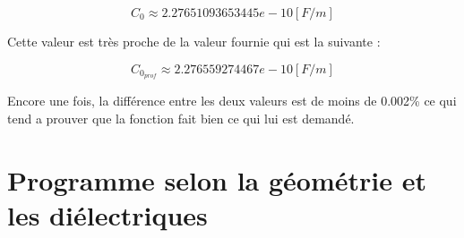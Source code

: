 \begin{equation}
	C_0 \approx 2.27651093653445e-10 [F/m]
\end{equation}

Cette valeur est très proche de la valeur fournie qui est la suivante :

\begin{equation}
	C_{0_{prof}} \approx 2.276559274467e-10 [F/m]
\end{equation}

Encore une fois, la différence entre les deux valeurs est de moins de 0.002\% ce qui tend a prouver que la fonction fait bien ce qui lui est demandé.

\section{Programme selon la géométrie et les diélectriques}
